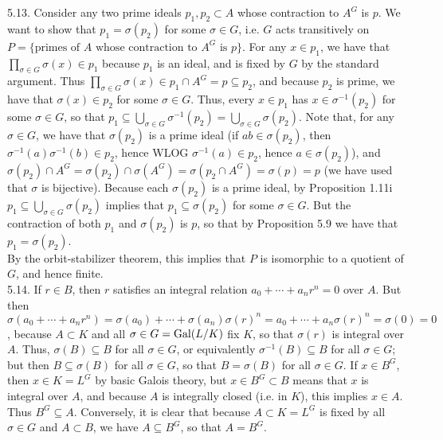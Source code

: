\documentclass[11pt]{article}
\begin{document}
\num{5.13.} Consider any two prime ideals $p_1,p_2\subset A$ whose contraction to $A^G$ is $p$. We want to show that $p_1=\sigma(p_2)$ for some $\sigma\in G$, i.e. $G$ acts transitively on $P=\{\text{primes of $A$ whose contraction to $A^G$ is $p$}\}$. For any $x\in p_1$, we have that $\prod_{\sigma\in G}\sigma(x)\in p_1$ because $p_1$ is an ideal, and is fixed by $G$ by the standard argument. Thus $\prod_{\sigma\in G}\sigma(x)\in p_1\cap A^G=p\subseteq p_2$, and because $p_2$ is prime, we have that $\sigma(x)\in p_2$ for some $\sigma\in G$. Thus, every $x\in p_1$ has $x\in \sigma^{-1}(p_2)$ for some $\sigma\in G$, so that $p_1\subseteq\bigcup_{\sigma\in G}\sigma^{-1}(p_2)=\bigcup_{\sigma\in G}\sigma(p_2)$. Note that, for any $\sigma\in G$, we have that $\sigma(p_2)$ is a prime ideal (if $ab\in\sigma(p_2)$, then $\sigma^{-1}(a)\sigma^{-1}(b)\in p_2$, hence WLOG $\sigma^{-1}(a)\in p_2$, hence $a\in \sigma(p_2)$), and $\sigma(p_2)\cap A^G=\sigma(p_2)\cap\sigma(A^G)=\sigma(p_2\cap A^G)=\sigma(p)=p$ (we have used that $\sigma$ is bijective). Because each $\sigma(p_2)$ is a prime ideal, by Proposition 1.11i $p_1\subseteq\bigcup_{\sigma\in G}\sigma(p_2)$ implies that $p_1\subseteq\sigma(p_2)$ for some $\sigma\in G$. But the contraction of both $p_1$ and $\sigma(p_2)$ is $p$, so that by Proposition 5.9 we have that $p_1=\sigma(p_2)$.\\

By the orbit-stabilizer theorem, this implies that $P$ is isomorphic to a quotient of $G$, and hence finite.\\

\num{5.14.} If $r\in B$, then $r$ satisfies an integral relation $a_0+\cdots+a_nr^n=0$ over $A$. But then $\sigma(a_0+\cdots+a_nr^n)=\sigma(a_0)+\cdots+\sigma(a_n)\sigma(r)^n=a_0+\cdots+a_n\sigma(r)^n=\sigma(0)=0$, because $A\subset K$ and all $\sigma\in G=\operatorname{Gal}(L/K)$ fix $K$, so that $\sigma(r)$ is integral over $A$. Thus, $\sigma(B)\subseteq B$ for all $\sigma\in G$, or equivalently $\sigma^{-1}(B)\subseteq B$ for all $\sigma\in G$; but then $B\subseteq \sigma(B)$ for all $\sigma\in G$, so that $B=\sigma(B)$ for all $\sigma\in G$. If $x\in B^G$, then $x\in K=L^G$ by basic Galois theory, but $x\in B^G\subset B$ means that $x$ is integral over $A$, and because $A$ is integrally closed (i.e. in $K$), this implies $x\in A$. Thus $B^G\subseteq A$. Conversely, it is clear that because $A\subset K=L^G$ is fixed by all $\sigma\in G$ and $A\subset B$, we have $A\subseteq B^G$, so that $A=B^G$.     \\
\end{document}
